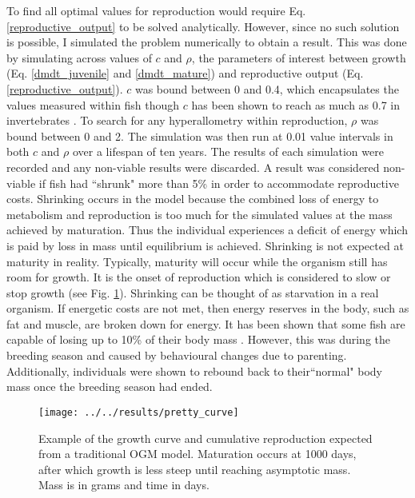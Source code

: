 \documentclass[a4paper, 11pt, hidelinks]{article} %
\begin{document}
	To find all optimal values for reproduction would require Eq. \ref{reproductive_output} to be solved analytically.  However, since no such solution is possible, I simulated the problem numerically to obtain a result.  This was done by simulating across values of $ c $ and $ \rho $, the parameters of interest between growth (Eq. \ref{dmdt_juvenile} and \ref{dmdt_mature}) and reproductive output (Eq. \ref{reproductive_output}).  $ c $ was bound between 0 and 0.4, which encapsulates the values measured within fish \parencite{Benoit2018, Roff1983, Fontoura2009, Lambert2000, Wootton1985} though $ c $ has been shown to reach as much as 0.7 in invertebrates \parencite{Parker2018}.  To search for any hyperallometry within reproduction, $ \rho $ was bound between 0 and 2.  
	The simulation was then run at 0.01 value intervals in both $c$ and $\rho$ over a lifespan of ten years.  The results of each simulation were recorded and any non-viable results were discarded.  A result was considered non-viable if fish had ``shrunk" more than 5\% in order to accommodate reproductive costs.  Shrinking occurs in the model because  the combined loss of energy to metabolism and reproduction is too much for the simulated values at the mass achieved by maturation.  Thus the individual experiences a deficit of energy which is paid by loss in mass until equilibrium is achieved. %
	Shrinking is not expected at maturity in reality.  Typically, maturity will occur while the organism still has room for growth.  It is the onset of reproduction which is considered to slow or stop growth %
	(see Fig. \ref{OGM_Curve}).  Shrinking can be thought of as starvation in a real organism.  If energetic costs are not met, then energy reserves in the body, such as fat and muscle, are broken down for energy.  It has been shown that some fish are capable of losing up to 10\% of their body mass \parencite{VandenBerghe1992}.  However, this was during the breeding season and caused by behavioural changes due to parenting.  Additionally, individuals were shown to rebound back to their``normal" body mass once the breeding season had ended. %
	\begin{figure}[H]
		\centering 
		\texttt{[image: ../../results/pretty\_curve]}
		\caption{Example of the growth curve and cumulative reproduction expected from a traditional OGM model. Maturation occurs at 1000 days, after which growth is less steep until reaching asymptotic mass.  Mass is in grams and time in days.}
		\label{OGM_Curve}
	\end{figure}
	
\end{document}
